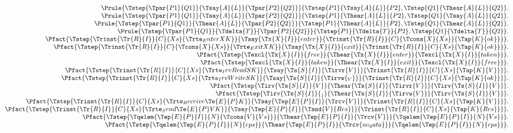 \[
\begin{array}{r@{}c@{}l}
\Prule{\Tstep{\Tpar{P1}{Q1}}{\Tsay{A}{L}}{\Tpar{P2}{Q2}}}{\Tstep{P1}{\Tsay{A}{L}}{P2},\Tstep{Q1}{\Thear{A}{L}}{Q2}}.
\\\Prule{\Tstep{\Tpar{P1}{Q1}}{\Tsay{A}{L}}{\Tpar{P2}{Q2}}}{\Tstep{P1}{\Thear{A}{L}}{P2},\Tstep{Q1}{\Tsay{A}{L}}{Q2}}.
\\\Prule{\Tstep{\Tpar{P1}{Q1}}{\Thear{A}{L}}{\Tpar{P2}{Q2}}}{\Tstep{P1}{\Thear{A}{L}}{P2},\Tstep{Q1}{\Thear{A}{L}}{Q2}}.
\\\Prule{\Tstep{\Tpar{P1}{Q1}}{\Tdelta{T}}{\Tpar{P2}{Q2}}}{\Tstep{P1}{\Tdelta{T}}{P2},\Tstep{Q1}{\Tdelta{T}}{Q2}}.
\\\Pfact{\Tstep{\Trinst{\Tr{R}{I}}{C}{Xs}{\Trte_Enter{X}{K}}}{\Tsay{\Tx{X}{I}}{enter}}{\Trinst{\Tr{R}{I}}{C}{\Tcons{X}{Xs}}{\Tap{K}{ok}}}}.
\\\Pfact{\Tstep{\Trinst{\Tr{R}{I}}{C}{\Tcons{X}{Xs}}{\Trte_Exit{X}{K}}}{\Tsay{\Tx{X}{I}}{exit}}{\Trinst{\Tr{R}{I}}{C}{Xs}{\Tap{K}{ok}}}}.
\\\Pfact{\Tstep{\Texcl{\Tx{X}{I}}{free}}{\Thear{\Tx{X}{I}}{enter}}{\Texcl{\Tx{X}{I}}{taken}}}.
\\\Pfact{\Tstep{\Texcl{\Tx{X}{I}}{taken}}{\Thear{\Tx{X}{I}}{exit}}{\Texcl{\Tx{X}{I}}{free}}}.
\\\Pfact{\Tstep{\Trinst{\Tr{R}{I}}{C}{Xs}{\Trte_IrvRead{S}{K}}}{\Tsay{\Ts{S}{I}}{\Tirvr{V}}}{\Trinst{\Tr{R}{I}}{C}{Xs}{\Tap{K}{V}}}}.
\\\Pfact{\Tstep{\Trinst{\Tr{R}{I}}{C}{Xs}{\Trte_IrvWrite{S}{K}}}{\Tsay{\Ts{S}{I}}{\Tirvw{_V}}}{\Trinst{\Tr{R}{I}}{C}{Xs}{\Tap{K}{ok}}}}.
\\\Pfact{\Tstep{\Tirv{\Ts{S}{I}}{V}}{\Thear{\Ts{S}{I}}{\Tirvr{V}}}{\Tirv{\Ts{S}{I}}{V}}}.
\\\Pfact{\Tstep{\Tirv{\Ts{S}{I}}{_}}{\Thear{\Ts{S}{I}}{\Tirvw{V}}}{\Tirv{\Ts{S}{I}}{V}}}.
\\\Pfact{\Tstep{\Trinst{\Tr{R}{I}}{C}{Xs}{\Trte_Receive{\Te{E}{P}}{K}}}{\Tsay{\Tep{E}{P}{I}}{\Trcv{V}}}{\Trinst{\Tr{R}{I}}{C}{Xs}{\Tap{K}{V}}}}.
\\\Pfact{\Tstep{\Trinst{\Tr{R}{I}}{C}{Xs}{\Trte_Send{\Te{E}{P}}{V}{K}}}{\Tsay{\Tep{E}{P}{I}}{\Tsnd{V}{Res}}}{\Trinst{\Tr{R}{I}}{C}{Xs}{\Tap{K}{Res}}}}.
\\\Pfact{\Tstep{\Tqelem{\Tep{E}{P}{I}}{N}{\Tcons{V}{Vs}}}{\Thear{\Tep{E}{P}{I}}{\Trcv{V}}}{\Tqelem{\Tep{E}{P}{I}}{N}{Vs}}}.
\\\Pfact{\Tstep{\Tqelem{\Tep{E}{P}{I}}{N}{eps}}{\Thear{\Tep{E}{P}{I}}{\Trcv{no_data}}}{\Tqelem{\Tep{E}{P}{I}}{N}{eps}}}.

\end{array}\]

